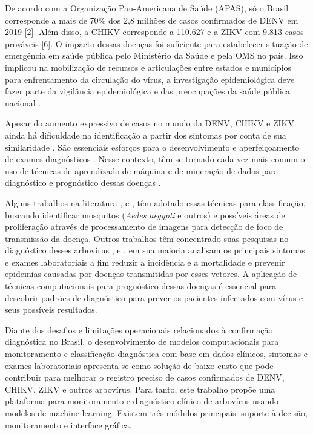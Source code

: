 \documentclass[12pt]{article}
\begin{document}
De acordo com a Organização Pan-Americana de Saúde (APAS), só o Brasil corresponde a mais de 70\% dos 2,8 milhões de casos confirmados de DENV em 2019 [2]. Além disso, a CHIKV corresponde a 110.627 e a ZIKV com 9.813 casos prováveis [6]. O impacto dessas doenças foi suficiente para estabelecer situação de emergência em saúde pública pelo Ministério da Saúde e pela OMS no país. Isso implicou na mobilização de recursos e articulações entre estados e municípios para enfrentamento da circulação do vírus, a investigação epidemiológica deve fazer parte da vigilância epidemiológica e das preocupações da saúde pública nacional \cite{PAPER07}.

Apesar do aumento expressivo de casos no mundo da DENV, CHIKV e ZIKV ainda há dificuldade na identificação a partir dos sintomas por conta de sua similaridade \cite{PAPER03}. São essenciais esforços para o desenvolvimento e aperfeiçoamento de exames diagnósticos \cite{PAPER07}. Nesse contexto, têm se tornado cada vez mais comum o uso de técnicas de aprendizado de máquina e de mineração de dados para diagnóstico e prognóstico dessas  doenças \cite{PAPER03}. 

Alguns trabalhos na literatura \cite{PAPER08}, \cite{PAPER09} e \cite{PAPER10}, têm adotado essas técnicas para classificação, buscando identificar mosquitos (\textit{Aedes aegypti} e outros) e possíveis áreas de proliferação através de processamento de imagens para detecção de foco de transmissão da doença. Outros trabalhos têm concentrado suas pesquisas no diagnóstico desses arbovírus \cite{PAPER11}, \cite{PAPER12} e \cite{PAPER13}, em sua maioria analisam os principais sintomas e exames laboratoriais a fim reduzir a incidência e a mortalidade e prevenir epidemias causadas por doenças transmitidas por esses vetores. A aplicação de técnicas computacionais para prognóstico dessas doenças é essencial para descobrir padrões de diagnóstico para prever os pacientes infectados com vírus e seus possíveis resultados.

Diante dos desafios e limitações operacionais relacionados à confirmação diagnóstica no Brasil, o desenvolvimento de modelos computacionais para monitoramento e classificação diagnóstica com base em dados clínicos, sintomas e exames laboratoriais apresenta-se como solução de baixo custo que pode contribuir para melhorar o registro preciso de casos confirmados de DENV, CHIKV, ZIKV e outros arbovírus. Para tanto, este trabalho propõe uma plataforma para monitoramento e diagnóstico clínico de arbovírus usando modelos de machine learning. Existem três módulos principais: suporte à decisão, monitoramento e interface gráfica. 
\end{document}
